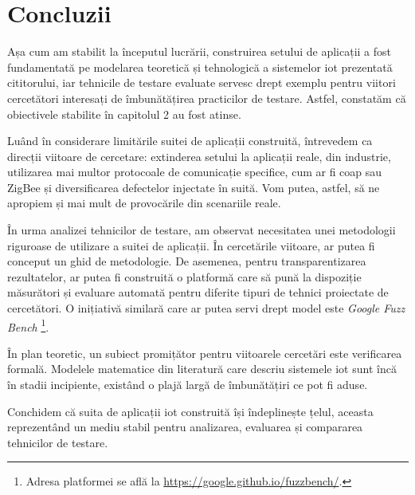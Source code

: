 \chapter{Concluzii}

Așa cum am stabilit la începutul lucrării, construirea setului de aplicații a fost fundamentată pe modelarea teoretică și tehnologică a sistemelor \acrshort{iot} prezentată cititorului, iar tehnicile de testare evaluate servesc drept exemplu pentru viitori cercetători interesați de îmbunătățirea practicilor de testare. Astfel, constatăm că obiectivele stabilite în capitolul 2 au fost atinse.

Luând în considerare limitările suitei de aplicații construită, întrevedem ca direcții viitoare de cercetare: extinderea setului la aplicații reale, din industrie, utilizarea mai multor protocoale de comunicație specifice, cum ar fi \acrshort{coap} sau ZigBee și diversificarea defectelor injectate în suită. Vom putea, astfel, să ne apropiem și mai mult de provocările din scenariile reale.

În urma analizei tehnicilor de testare, am observat necesitatea unei metodologii riguroase de utilizare a suitei de aplicații. În cercetările viitoare, ar putea fi conceput un ghid de metodologie. De asemenea, pentru transparentizarea rezultatelor, ar putea fi construită o platformă care să pună la dispoziție măsurători și evaluare automată pentru diferite tipuri de tehnici proiectate de cercetători. O inițiativă similară care ar putea servi drept model este \textit{Google Fuzz Bench} \footnote{Adresa platformei se află la \url{https://google.github.io/fuzzbench/}.}.

În plan teoretic, un subiect promițător pentru viitoarele cercetări este verificarea formală. Modelele matematice din literatură care descriu sistemele \acrshort{iot} sunt încă în stadii incipiente, existând o plajă largă de îmbunătățiri ce pot fi aduse. 

Conchidem că suita de aplicații \acrlong{iot} construită își îndeplinește țelul, aceasta reprezentând un mediu stabil pentru analizarea, evaluarea și compararea tehnicilor de testare. 